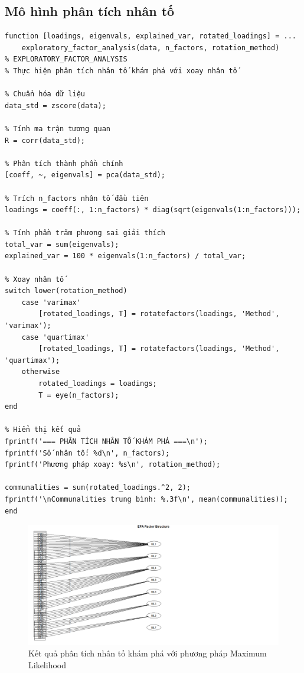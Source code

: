 \subsection{Mô hình phân tích nhân tố}

\begin{matlab}
\begin{lstlisting}
function [loadings, eigenvals, explained_var, rotated_loadings] = ...
    exploratory_factor_analysis(data, n_factors, rotation_method)
% EXPLORATORY_FACTOR_ANALYSIS
% Thực hiện phân tích nhân tố khám phá với xoay nhân tố

% Chuẩn hóa dữ liệu
data_std = zscore(data);

% Tính ma trận tương quan
R = corr(data_std);

% Phân tích thành phần chính
[coeff, ~, eigenvals] = pca(data_std);

% Trích n_factors nhân tố đầu tiên
loadings = coeff(:, 1:n_factors) * diag(sqrt(eigenvals(1:n_factors)));

% Tính phần trăm phương sai giải thích
total_var = sum(eigenvals);
explained_var = 100 * eigenvals(1:n_factors) / total_var;

% Xoay nhân tố
switch lower(rotation_method)
    case 'varimax'
        [rotated_loadings, T] = rotatefactors(loadings, 'Method', 'varimax');
    case 'quartimax'
        [rotated_loadings, T] = rotatefactors(loadings, 'Method', 'quartimax');
    otherwise
        rotated_loadings = loadings;
        T = eye(n_factors);
end

% Hiển thị kết quả
fprintf('=== PHÂN TÍCH NHÂN TỐ KHÁM PHÁ ===\n');
fprintf('Số nhân tố: %d\n', n_factors);
fprintf('Phương pháp xoay: %s\n', rotation_method);

communalities = sum(rotated_loadings.^2, 2);
fprintf('\nCommunalities trung bình: %.3f\n', mean(communalities));
end
\end{lstlisting}
\end{matlab}

\begin{figure}[h!]
    \centering
    \includegraphics[width=0.8\linewidth]{../../assets/images/EFA_ML.png}
    \caption{Kết quả phân tích nhân tố khám phá với phương pháp Maximum Likelihood}
\end{figure}

